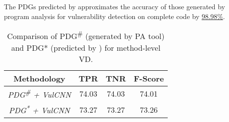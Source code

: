 \begin{tcolorbox}
{The PDGs predicted by \tool approximates the accuracy of those
  generated by program analysis for vulnerability detection on
  complete code by \underline{98.98\%}}.
\end{tcolorbox}

%


\begin{table}[t]
  \centering
  \small
  \caption{Comparison of PDG\textsuperscript{\#} (generated by PA tool) and PDG* (predicted by \tool) for  method-level VD.}
\begin{tabular}{c|c|c|c}
\hline
\textbf{Methodology}                       & \textbf{TPR}       & \textbf{TNR} & \textbf{F-Score} \\ \hline
\textit{PDG\textsuperscript{\#} + VulCNN}  &  74.03             &  74.03       & 74.01                  \\
\textit{PDG\textsuperscript{*} + VulCNN}   &  73.27             &  73.27       & 73.26\\
\hline
\end{tabular}
\label{tab:extr-method}
\end{table}
